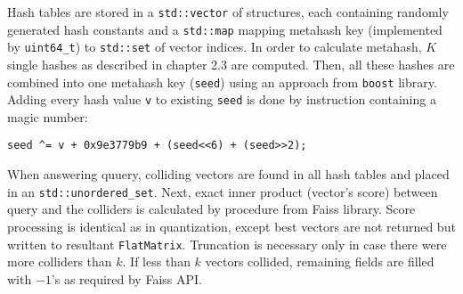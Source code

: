 Hash tables are stored in a \texttt{std::vector} of structures, each containing
randomly generated hash constants and a \texttt{std::map} mapping
metahash key (implemented by \texttt{uint64\_t}) to \texttt{std::set} of vector indices.
In order to calculate metahash, $K$ single hashes as described in chapter 2.3 are computed.
Then, all these hashes are combined into one metahash key (\texttt{seed}) using an approach from
\texttt{boost} library. Adding every hash value \texttt{v} to existing \texttt{seed} is done
by instruction containing a magic number:
\begin{verbatim}
seed ^= v + 0x9e3779b9 + (seed<<6) + (seed>>2);
\end{verbatim}

When answering quuery, colliding vectors are found in all hash
tables and placed in an \texttt{std::unordered\_set}. Next, exact inner product (vector's score)
between query and the colliders is calculated by  procedure from Faiss library.
Score processing is identical as in quantization, except best vectors are not returned but
written to resultant \texttt{FlatMatrix}. Truncation is necessary only in case there were more
colliders than $k$.
If less than $k$ vectors collided, remaining fields are filled with $-1$'s as required by
Faiss API.
